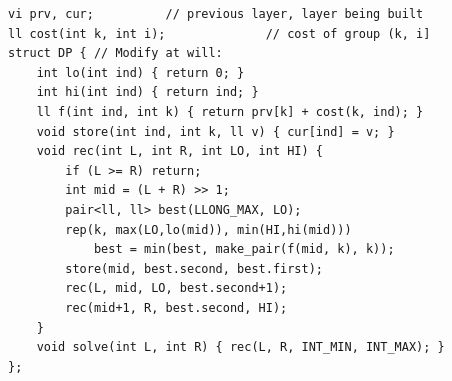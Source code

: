 \begin{lstlisting}
vi prv, cur;          // previous layer, layer being built
ll cost(int k, int i);              // cost of group (k, i]
struct DP { // Modify at will:
    int lo(int ind) { return 0; }
    int hi(int ind) { return ind; }
    ll f(int ind, int k) { return prv[k] + cost(k, ind); }
    void store(int ind, int k, ll v) { cur[ind] = v; }
    void rec(int L, int R, int LO, int HI) {
        if (L >= R) return;
        int mid = (L + R) >> 1;
        pair<ll, ll> best(LLONG_MAX, LO);
        rep(k, max(LO,lo(mid)), min(HI,hi(mid)))
            best = min(best, make_pair(f(mid, k), k));
        store(mid, best.second, best.first);
        rec(L, mid, LO, best.second+1);
        rec(mid+1, R, best.second, HI);
    }
    void solve(int L, int R) { rec(L, R, INT_MIN, INT_MAX); }
};
\end{lstlisting}
